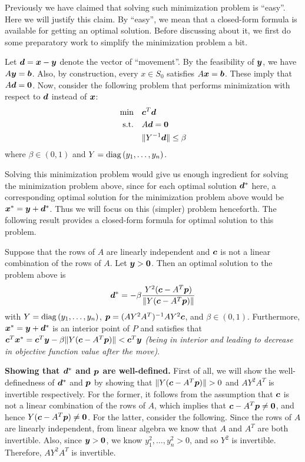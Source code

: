 \begin{enumerate}
Previously we have claimed that solving such minimization problem is “easy”.
Here we will justify this claim. By “easy”, we mean that a closed-form formula
is available for getting an optimal solution.  Before discussing about it, we
first do some preparatory work to simplify the minimization problem a bit.

Let \(\bm{d}=\bm{x}-\bm{y}\) denote the vector of “movement”. By the
feasibility of \(\bm{y}\), we have \(A\bm{y}=\bm{b}\). Also, by
construction, every \(x\in S_0\) satisfies \(A\bm{x}=\bm{b}\). These imply
that \(A\bm{d}=\bm{0}\). Now, consider the following problem that performs
minimization with respect to \(\bm{d}\) instead of \(\bm{x}\):
\begin{align*}
\text{min}\quad&\bm{c}^{T}\bm{d} \\
\text{s.t.}\quad&A\bm{d}=\bm{0} \\
&\|Y^{-1}\bm{d}\|\le\beta
\end{align*}
where \(\beta\in (0,1)\) and \(Y=\operatorname{diag}\left(y_1,\dotsc,y_n\right)\).

Solving this minimization problem would give us enough ingredient for solving
the minimization problem above, since for each optimal solution
\(\bm{d}^{*}\) here, a corresponding optimal solution for the minimization
problem above would be \(\bm{x}^{*}=\bm{y}+\bm{d}^{*}\). Thus we will
focus on this (simpler) problem henceforth.  The following result provides a
closed-form formula for optimal solution to this problem.

\begin{proposition}
\label{prp:min-ellip-closed-form}
Suppose that the rows of \(A\) are linearly independent and \(\bm{c}\) is not
a linear combination of the rows of \(A\). Let \(\bm{y}>\bm{0}\). Then an
optimal solution to the problem above is
\[
\bm{d}^{*}=-\beta\frac{Y^{2}(\bm{c}-A^{T}\bm{p})}{\|Y(\bm{c}-A^{T}\bm{p})\|}
\]
with \(Y=\operatorname{diag}\left(y_1,\dotsc,y_n\right)\),
\(\bm{p}=(AY^{2}A^{T})^{-1}AY^{2}\bm{c}\), and \(\beta\in (0,1)\).
Furthermore, \(\bm{x}^{*}=\bm{y}+\bm{d}^{*}\) is an interior point of
\(P\) and satisfies that \(\bm{c}^{T}\bm{x}^{*}=\bm{c}^{T}\bm{y}
-\beta\|Y(\bm{c}-A^{T}\bm{p})\|<\bm{c}^{T}\bm{y}\) \emph{(being in interior and
leading to decrease in objective function value after the move)}.
\end{proposition}
\begin{pf}
\textbf{Showing that \(\bm{d}^{*}\) and \(\bm{p}\) are well-defined.} First
of all, we will show the well-definedness of \(\bm{d}^{*}\) and \(\bm{p}\)
by showing that \(\|Y(\vect{c}-A^{T}\vect{p})\|> 0\) and \(AY^{2}A^{T}\) is
invertible respectively. For the former, it follows from the assumption that
\(\bm{c}\) is not a linear combination of the rows of \(A\), which implies
that \(\bm{c}-A^{T}\bm{p}\ne\bm{0}\), and hence
\(Y(\bm{c}-A^{T}\bm{p})\ne\bm{0}\). For the latter, consider the
following. Since the rows of \(A\) are linearly independent, from linear
algebra we know that \(A\) and \(A^{T}\) are both invertible.  Also, since
\(\bm{y}>\bm{0}\), we know \(y_1^{2},\dotsc,y_n^{2}>0\), and so \(Y^{2}\)
is invertible. Therefore, \(AY^{2}A^{T}\) is invertible.


\end{pf}
\end{enumerate}
